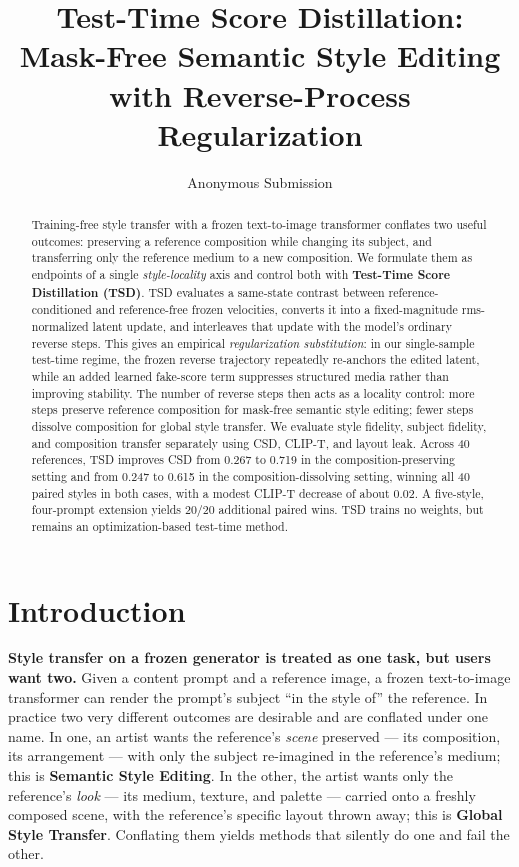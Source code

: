 \documentclass[letterpaper]{article} %
\title{Test-Time Score Distillation: Mask-Free Semantic Style Editing with
Reverse-Process Regularization}
\author{
    Anonymous Submission
}
\begin{document}
\maketitle

\begin{abstract}
Training-free style transfer with a frozen text-to-image transformer conflates
two useful outcomes: preserving a reference composition while changing its
subject, and transferring only the reference medium to a new composition. We
formulate them as endpoints of a single \emph{style-locality} axis and control
both with \textbf{Test-Time Score Distillation (TSD)}. TSD evaluates a
same-state contrast between reference-conditioned and reference-free frozen
velocities, converts it into a fixed-magnitude rms-normalized latent update,
and interleaves that update with the model's ordinary reverse steps. This gives
an empirical \emph{regularization substitution}: in our single-sample
test-time regime, the frozen reverse trajectory repeatedly re-anchors the
edited latent, while an added learned fake-score term suppresses structured
media rather than improving stability. The number of reverse steps then acts
as a locality control: more steps preserve reference composition for
mask-free semantic style editing; fewer steps dissolve composition for global
style transfer. We evaluate style fidelity, subject fidelity, and composition
transfer separately using CSD, CLIP-T, and layout leak. Across 40 references,
TSD improves CSD from 0.267 to 0.719 in the composition-preserving setting and
from 0.247 to 0.615 in the composition-dissolving setting, winning all 40
paired styles in both cases, with a modest CLIP-T decrease of about 0.02. A
five-style, four-prompt extension yields 20/20 additional paired wins. TSD
trains no weights, but remains an optimization-based test-time method.
\end{abstract}

\section{Introduction}

\textbf{Style transfer on a frozen generator is treated as one task, but
users want two.} Given a content prompt and a reference image, a frozen
text-to-image transformer can render the prompt's subject ``in the style of''
the reference. In practice two very different outcomes are desirable and are
conflated under one name. In one, an artist wants the reference's
\emph{scene} preserved --- its composition, its arrangement --- with only the
subject re-imagined in the reference's medium; this is \textbf{Semantic Style
Editing}. In the other, the artist wants only the reference's \emph{look}
--- its medium, texture, and palette --- carried onto a freshly composed
scene, with the reference's specific layout thrown away; this is
\textbf{Global Style Transfer}. Conflating them yields methods that silently
do one and fail the other.
\end{document}
